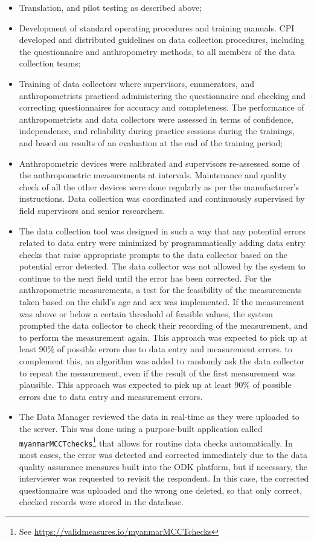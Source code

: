 \documentclass[12pt,a4paper]{article}
\let\rmarkdownfootnote\footnote%
\def\footnote{\protect\rmarkdownfootnote}
\begin{document}
\begin{itemize}
\item
  Translation, and pilot testing as described above;
\item
  Development of standard operating procedures and training manuals. CPI developed and distributed guidelines on data collection procedures, including the questionnaire and anthropometry methods, to all members of the data collection teams;
\item
  Training of data collectors where supervisors, enumerators, and anthropometrists practiced administering the questionnaire and checking and correcting questionnaires for accuracy and completeness. The performance of anthropometrists and data collectors were assessed in terms of confidence, independence, and reliability during practice sessions during the trainings, and based on results of an evaluation at the end of the training period;
\item
  Anthropometric devices were calibrated and supervisors re-assessed some of the anthropometric measurements at intervals. Maintenance and quality check of all the other devices were done regularly as per the manufacturer's instructions. Data collection was coordinated and continuously supervised by field supervisors and senior researchers.
\item
  The data collection tool was designed in such a way that any potential errors related to data entry were minimized by programmatically adding data entry checks that raise appropriate prompts to the data collector based on the potential error detected. The data collector was not allowed by the system to continue to the next field until the error has been corrected. For the anthropometric measurements, a test for the feasibility of the measurements taken based on the child's age and sex was implemented. If the measurement was above or below a certain threshold of feasible values, the system prompted the data collector to check their recording of the measurement, and to perform the measurement again. This approach was expected to pick up at least 90\% of possible errors due to data entry and measurement errors. to complement this, an algorithm was added to randomly ask the data collector to repeat the measurement, even if the result of the first measurement was plausible. This approach was expected to pick up at least 90\% of possible errors due to data entry and measurement errors.
\item
  The Data Manager reviewed the data in real-time as they were uploaded to the server. This was done using a purpose-built application called \texttt{myanmarMCCTchecks}\footnote{See \url{https://validmeasures.io/myanmarMCCTchecks}} that allows for routine data checks automatically. In most cases, the error was detected and corrected immediately due to the data quality assurance measures built into the ODK platform, but if necessary, the interviewer was requested to revisit the respondent. In this case, the corrected questionnaire was uploaded and the wrong one deleted, so that only correct, checked records were stored in the database.
\end{itemize}
\end{document}
